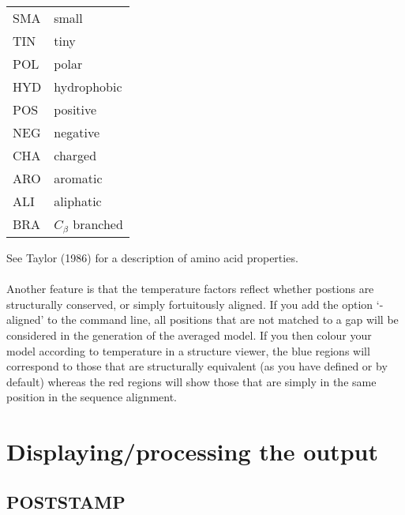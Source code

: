 \begin{tabular}{ll}
    SMA & small \\
    TIN & tiny \\
    POL & polar \\
    HYD & hydrophobic \\
    POS & positive \\
    NEG & negative \\
    CHA & charged \\
    ARO & aromatic \\
    ALI & aliphatic \\
    BRA & $C_{\beta}$ branched \\
\end{tabular}

See Taylor (1986) for a description of amino acid properties.\\ 
\nocite{taylor86a}
\\
Another feature is that the temperature factors reflect whether
postions are structurally conserved, or simply fortuitously aligned.  If you
add the option `-aligned' to the command line, all positions that are
not matched to a gap will be considered in the generation of the
averaged model.  If you then colour your model according to temperature
in a structure viewer, the blue regions will correspond to those that
are structurally equivalent (as you have defined or by default) whereas
the red regions will show those that are simply in the same position in
the sequence alignment.


\section{Displaying/processing the output}

\subsection{POSTSTAMP}

